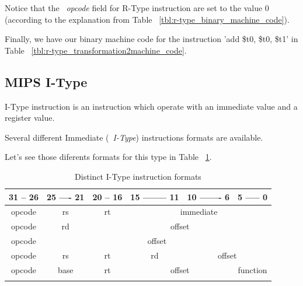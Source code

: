 \documentclass[
  oneside,
  11pt, a4paper,
  footinclude=true,
  headinclude=true,
  cleardoublepage=empty
]{scrbook}
\begin{document}
Notice that the ~\textit{opcode} field for R-Type instruction are set to the value 0 (according to the explanation from Table ~\ref{tbl:r-type_binary_machine_code}).

Finally, we have our binary machine code for the instruction 'add \$t0, \$t0, \$t1' in Table ~\ref{tbl:r-type_transformation2machine_code}.

\subsection{MIPS I-Type}

I-Type instruction is an instruction which operate with an immediate value and a register value. 

Several different Immediate (~\textit{I-Type}) instructions formats are available.

Let's see those diferents formats for this type in Table ~\ref{tbl:I-Type_instruction_format}.

\begin{table}[h!]
\centering
\begin{tabular}{ccccll}
\multicolumn{1}{l|}{31 -- 26} & \multicolumn{1}{l|}{25 ---- 21} & \multicolumn{1}{l|}{20 -- 16} & \multicolumn{1}{l|}{15 -------- 11} & \multicolumn{1}{l|}{10 ------- 6} & 5 ----- 0                     \\ \hline
\multicolumn{1}{|c|}{opcode}  & \multicolumn{1}{c|}{rs}         & \multicolumn{1}{c|}{rt}       & \multicolumn{3}{c|}{immediate}                                                                          \\ \hline
\multicolumn{1}{|c|}{opcode}  & \multicolumn{1}{c|}{rd}         & \multicolumn{4}{c|}{offset}                                                                                                             \\ \hline
\multicolumn{1}{|c|}{opcode}  & \multicolumn{5}{c|}{offset}                                                                                                                                               \\ \hline
\multicolumn{1}{|c|}{opcode}  & \multicolumn{1}{c|}{rs}         & \multicolumn{1}{c|}{rt}       & \multicolumn{1}{c|}{rd}             & \multicolumn{2}{c|}{offset}                                       \\ \hline
\multicolumn{1}{|c|}{opcode}  & \multicolumn{1}{c|}{base}       & \multicolumn{1}{c|}{rt}       & \multicolumn{2}{c|}{offset}                                             & \multicolumn{1}{c|}{function} \\ \hline
\multicolumn{1}{l}{}          & \multicolumn{1}{l}{}            & \multicolumn{1}{l}{}          & \multicolumn{1}{l}{}                &                                   &                              
\end{tabular}
\caption{Distinct I-Type instruction formats}
\label{tbl:I-Type_instruction_format}
\end{table}
\end{document}
